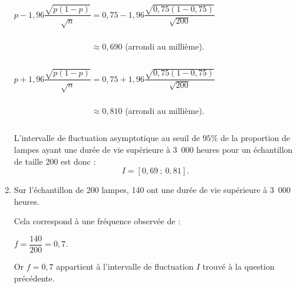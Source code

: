 \begin{corrige}
\begin{enumerate}
          \par
          \vspace{1cm}
          \par
          $p-1,96\dfrac{\sqrt{p(1-p)}}{\sqrt{n}}=0,75-1,96\dfrac{\sqrt{0,75(1-0,75)}}{\sqrt{200}}$
          \par
          $\phantom{p-1,96\dfrac{\sqrt{p(1-p)}}{\sqrt{n}}} \approx 0,690 $ (arrondi au millième).
          \par
          $p+1,96\dfrac{\sqrt{p(1-p)}}{\sqrt{n}}=0,75+1,96\dfrac{\sqrt{0,75(1-0,75)}}{\sqrt{200}}$
          \par
          $\phantom{p+1,96\dfrac{\sqrt{p(1-p)}}{\sqrt{n}}} \approx 0,810 $ (arrondi au millième).
          \par
          L'intervalle de fluctuation asymptotique au seuil de $95\%$ de la proportion de lampes ayant une durée de vie supérieure à 3\ 000 heures pour un échantillon de taille 200 est donc :
          \[ I=[0,69~;~0,81]. \]
          \item %
          Sur l'échantillon de 200 lampes, 140 ont une  durée de vie supérieure à 3\ 000 heures.
          \par
          Cela correspond à une fréquence observée de :
          \par
          $f=\dfrac{140}{200}=0,7$.
          \par
          Or $f=0,7$ appartient à l'intervalle de fluctuation $I$ trouvé à la question précédente.

\end{enumerate}
\end{corrige}

